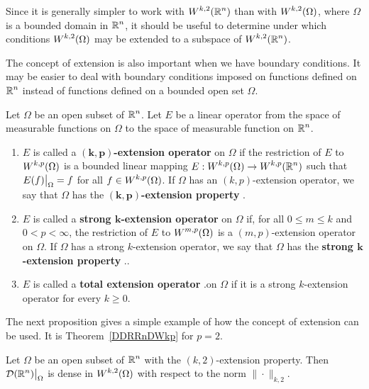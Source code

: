 Since it is generally simpler to work with $\displaystyle W^{k,2}(\mathbb{R}^n)$
than with $\displaystyle W^{k,2}(\Omega)$, where $\Omega$ is a bounded
domain in $\displaystyle \mathbb{R}^n$, it should be useful to determine under which
conditions $\displaystyle W^{k,2}(\Omega)$ 
may be extended to a subspace of $\displaystyle W^{k,2}(\mathbb{R}^n)$.

The concept of extension is also important when we have boundary
conditions.  It may be easier to deal with boundary conditions imposed on
functions defined on $\displaystyle \mathbb{R}^n$ instead of functions
defined on a bounded open set $\Omega$.

\begin{defn} \label{sob_k_ext_prop}
Let $\Omega$ be an open subset of $\displaystyle \mathbb{R}^n$.  Let $E$ be a linear
operator from the space of measurable functions on $\Omega$ to the
space of measurable function on $\displaystyle \mathbb{R}^n$.
\begin{enumerate}
\item $E$ is called a
{\bfseries $\mathbf{(k,p)}$-extension operator}%
on $\Omega$ if the restriction of $E$ to $\displaystyle W^{k,p}(\Omega)$
is a bounded linear mapping
$\displaystyle E:W^{k,p}(\Omega) \rightarrow W^{k,p}(\mathbb{R}^n)$ such that
$\displaystyle E(f)\big|_{\Omega} = f$ for all
$\displaystyle f\in W^{k,p}(\Omega)$.
If $\Omega$ has an $(k,p)$-extension operator, we say that $\Omega$ 
has the {\bfseries $\mathbf{(k,p)}$-extension property}%
.
\item $E$ is called a {\bfseries strong $\mathbf{k}$-extension operator}%
on $\Omega$ if, for all $0\leq m\leq k$ and $0 < p < \infty$, the
restriction of $E$ to $\displaystyle W^{m,p}(\Omega)$ is a
$(m,p)$-extension operator on $\Omega$.
If $\Omega$ has a strong $k$-extension operator, we say that $\Omega$ 
has the {\bfseries strong $\mathbf{k}$-extension property}%
..
\item $E$ is called a {\bfseries total extension operator}%
.on $\Omega$
if it is a strong $k$-extension operator for every $k \geq 0$.
\end{enumerate}
\end{defn}

The next proposition gives a simple example of how the concept of
extension can be used.  It is Theorem~\ref{DDRRnDWkp} for $p=2$.

\begin{theorem} \label{sob_dense_ext_H}
Let $\Omega$ be an open subset of $\displaystyle \mathbb{R}^n$ with the
$(k,2)$-extension property.  Then
$\displaystyle \mathcal{D}(\mathbb{R}^n)\big|_{\Omega}$ is dense in
$\displaystyle W^{k,2}(\Omega)$ with respect to the norm $\|\cdot\|_{k,2}$.
\end{theorem}

